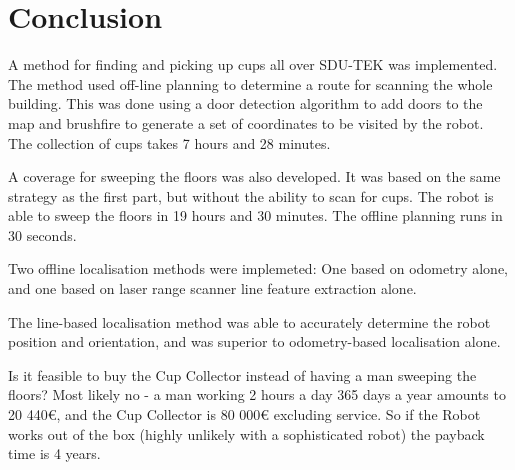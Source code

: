 \section{Conclusion}
\label{sec:conclusion}
A method for finding and picking up cups all over SDU-TEK was implemented. The method used off-line planning to determine a route for scanning the whole building. 
This was done using a door detection algorithm to add doors to the map and brushfire to generate a set of coordinates to be visited by the robot.
The collection of cups takes 7 hours and 28 minutes.

A coverage for sweeping the floors was also developed. It was based on the same strategy as the first part, but without the ability to scan for cups. The robot is able to sweep the floors in 19 hours and 30 minutes. The offline planning runs in 30 seconds. 

Two offline localisation methods were implemeted:
One based on odometry alone, and one based on laser range scanner line feature extraction alone.

The line-based localisation method was able to accurately determine the robot position and orientation,
and was superior to odometry-based localisation alone.

Is it feasible to buy the Cup Collector instead of having a man sweeping the floors?
Most likely no - a man working 2 hours a day 365 days a year amounts to 20 440€,
and the Cup Collector is 80 000€ excluding service.
So if the Robot works out of the box (highly unlikely with a sophisticated robot)
the payback time is 4 years.
